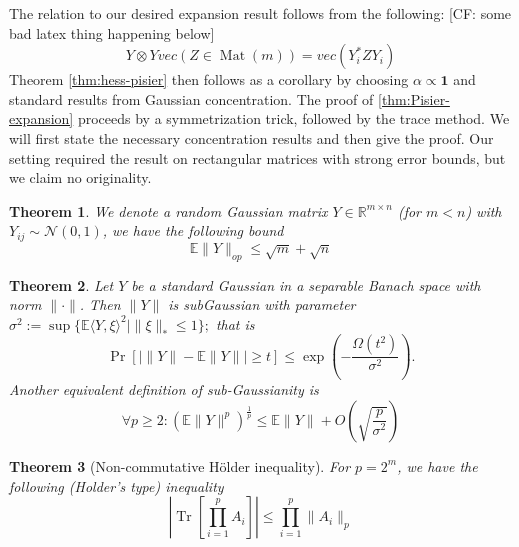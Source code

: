 \documentclass{article}
\newtheorem{theorem}{Theorem}
\newcommand{\R}{{\mathbb{R}}}
\newcommand{\mat}{\operatorname{Mat}}
\renewcommand{\vec}{\bm}
\newcommand{\E}{\mathbb{E}}
\newcommand\tr{\operatorname{Tr}}
\newcommand{\CF}[1]{{\color{purple}[CF: #1]}}
\begin{document}
The relation to our desired expansion result follows from the following:  \CF{some bad latex thing happening below}
\[ Y \otimes Y vec(Z \in \mat(m)) = vec( Y_{i}^{*} Z Y_{i})      \]
Theorem \ref{thm:hess-pisier} then follows as a corollary by choosing $\alpha \propto \vec{1}$ and standard results from Gaussian concentration. The proof of \ref{thm:Pisier-expansion} proceeds by a symmetrization trick, followed by the trace method. We will first state the necessary concentration results and then give the proof. Our setting required the result on rectangular matrices with strong error bounds, but we claim no originality.  

\begin{theorem} \cite{P86}
We denote a random Gaussian matrix $Y \in \R^{m \times n}$ (for $m < n$) with $Y_{ij} \sim \mathcal{N}(0,1)$, we have the following bound
\[ \E \|Y\|_{op} \leq \sqrt{m} + \sqrt{n} \]
\end{theorem}


\begin{theorem} \cite{P86}
Let $Y$ be a standard Gaussian in a separable Banach space with norm $\|\cdot\|$. Then $\|Y\|$ is subGaussian with parameter $\sigma^{2} := \sup \{ \E \langle Y, \xi \rangle^{2} \mid \|\xi\|_{*} \leq 1 \}; $ that is
\[ \Pr [ | \|Y\| - \E \|Y\| | \geq t ] \leq \exp \left( - \frac{\Omega(t^{2})}{\sigma^{2}} \right).   \]
Another equivalent definition of sub-Gaussianity is
\[ \forall p \geq 2: (\E \|Y\|^{p})^{\frac{1}{p}} \leq \E \|Y\| + O \left( \sqrt{\frac{p}{\sigma^{2}}} \right)   \]
\end{theorem}

\begin{theorem}[Non-commutative H\"older inequality]\label{thm:holder}
For $p = 2^{m}$, we have the following (Holder's type) inequality
\[ |\tr[\prod_{i=1}^{p} A_{i}]| \leq \prod_{i=1}^{p} \|A_{i}\|_{p}   \]
\end{theorem}
\end{document}
